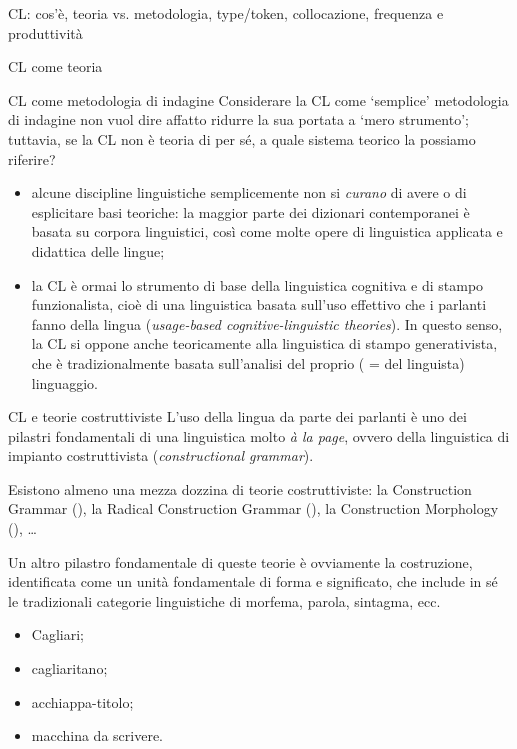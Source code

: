 \documentclass[pdf]{prosper}
\begin{document}
\begin{tsectionandpart}{CL: cos'è, teoria vs. metodologia, type/token, collocazione, frequenza e produttività}
\begin{slide}{CL come teoria}
\end{slide}

\begin{slide}{CL come metodologia di indagine}
Considerare la CL come `semplice' metodologia di indagine non vuol dire affatto ridurre la sua portata a `mero strumento'; tuttavia, se la CL non è teoria di per sé, a quale sistema teorico la possiamo riferire?

\begin{itemize}
	\item alcune discipline linguistiche semplicemente non si {\it curano} di avere o di esplicitare basi teoriche: la maggior parte dei dizionari contemporanei è basata su corpora linguistici, così come molte opere di linguistica applicata e didattica delle lingue;
	\item la CL è ormai lo strumento di base della linguistica cognitiva e di stampo funzionalista, cioè di una linguistica basata sull'uso effettivo che i parlanti fanno della lingua ({\it usage-based cognitive-linguistic theories}). In questo senso, la CL si oppone anche teoricamente alla linguistica di stampo generativista, che è tradizionalmente basata sull'analisi del proprio ( = del linguista) linguaggio.
\end{itemize}
\end{slide}

\begin{slide}{CL e teorie costruttiviste}
L'uso della lingua da parte dei parlanti è uno dei pilastri fondamentali di una linguistica molto {\it à la page}, ovvero della linguistica di impianto costruttivista ({\it constructional grammar}). 

	Esistono almeno una mezza dozzina di teorie costruttiviste: la Construction Grammar (\citealt{Goldberg2013}), la Radical Construction Grammar (\citealt{Croft2001}), la Construction Morphology (\citealt{Booij2010}), \dots

Un altro pilastro fondamentale di queste teorie è ovviamente la costruzione, identificata come un unità fondamentale di forma e significato, che include in sé le tradizionali categorie linguistiche di morfema, parola, sintagma, ecc.

	\begin{itemize}
		\item Cagliari;
		\item cagliaritano;
		\item acchiappa-titolo;
		\item macchina da scrivere.
    	\end{itemize}


\end{slide}
\end{tsectionandpart}
\end{document}
